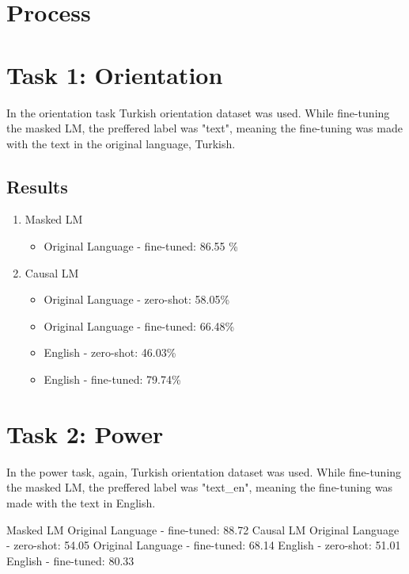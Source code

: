 \documentclass[
]{ceurart}
\begin{document}
\section{Process}




\section{Task 1: Orientation}

In the orientation task Turkish orientation dataset was used. While fine-tuning the masked LM, the preffered label was "text", meaning the fine-tuning was made with the text in the original language, Turkish.

\subsection{Results}
\begin{enumerate}
    \item Masked LM
    \begin{itemize}
        \item Original Language - fine-tuned: 86.55 \%
    \end{itemize}
    \item Causal LM
    \begin{itemize}
        \item Original Language - zero-shot: 58.05\%
        \item Original Language - fine-tuned: 66.48\%
        \item English - zero-shot: 46.03\%
        \item English - fine-tuned: 79.74\%
    \end{itemize}
\end{enumerate}


\section{Task 2: Power}


In the power task, again, Turkish orientation dataset was used. While fine-tuning the masked LM, the preffered label was "text\_en", meaning the fine-tuning was made with the text in English.

Masked LM
Original Language - fine-tuned: 88.72 %
Causal LM
Original Language - zero-shot: 54.05%
Original Language - fine-tuned: 68.14%
English - zero-shot: 51.01%
English - fine-tuned: 80.33%
\end{document}
